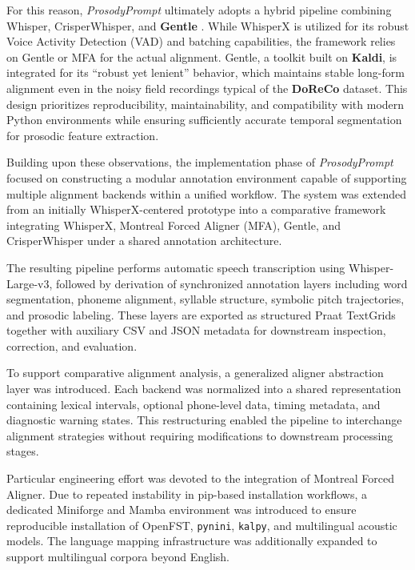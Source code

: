 For this reason, \textit{ProsodyPrompt} ultimately adopts a hybrid pipeline combining Whisper, CrisperWhisper, and \textbf{Gentle} \cite{ochshorn2015gentle}. While WhisperX is utilized for its robust Voice Activity Detection (VAD) and batching capabilities, the framework relies on Gentle or MFA for the actual alignment. Gentle, a toolkit built on \textbf{Kaldi}, is integrated for its ``robust yet lenient'' behavior, which maintains stable long-form alignment even in the noisy field recordings typical of the \textbf{DoReCo} dataset. This design prioritizes reproducibility, maintainability, and compatibility with modern Python environments while ensuring sufficiently accurate temporal segmentation for prosodic feature extraction.

Building upon these observations, the implementation phase of \textit{ProsodyPrompt} focused on constructing a modular annotation environment capable of supporting multiple alignment backends within a unified workflow. The system was extended from an initially WhisperX-centered prototype into a comparative framework integrating WhisperX, Montreal Forced Aligner (MFA), Gentle, and CrisperWhisper under a shared annotation architecture.

The resulting pipeline performs automatic speech transcription using Whisper-Large-v3, followed by derivation of synchronized annotation layers including word segmentation, phoneme alignment, syllable structure, symbolic pitch trajectories, and prosodic labeling. These layers are exported as structured Praat TextGrids together with auxiliary CSV and JSON metadata for downstream inspection, correction, and evaluation.

To support comparative alignment analysis, a generalized aligner abstraction layer was introduced. Each backend was normalized into a shared representation containing lexical intervals, optional phone-level data, timing metadata, and diagnostic warning states. This restructuring enabled the pipeline to interchange alignment strategies without requiring modifications to downstream processing stages.

Particular engineering effort was devoted to the integration of Montreal Forced Aligner. Due to repeated instability in pip-based installation workflows, a dedicated Miniforge and Mamba environment was introduced to ensure reproducible installation of OpenFST, \texttt{pynini}, \texttt{kalpy}, and multilingual acoustic models. The language mapping infrastructure was additionally expanded to support multilingual corpora beyond English.

